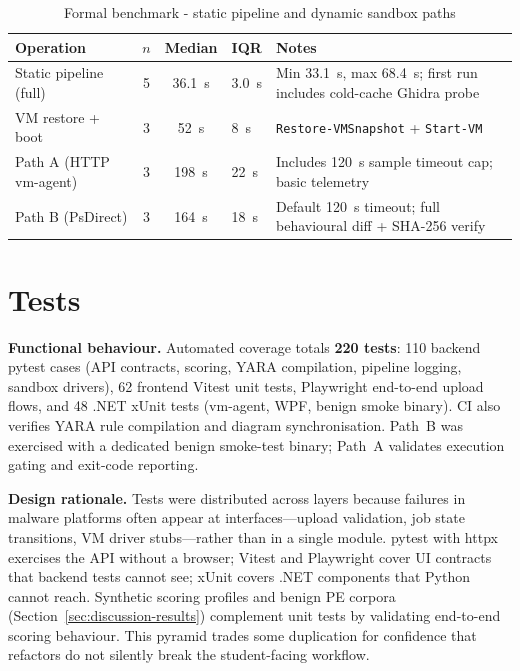 \begin{table}[htbp]
    \centering
    \caption{Formal benchmark - static pipeline and dynamic sandbox paths}
    \label{tab:benchmark}
    \small
    \begin{tabularx}{\linewidth}{@{}>{\raggedright\arraybackslash}p{3.2cm}ccp{1.0cm}Y@{}}
        \toprule
        \textbf{Operation} & \textbf{$n$} & \textbf{Median} & \textbf{IQR} & \textbf{Notes} \\
        \midrule
        Static pipeline (full) & 5 & 36.1~s & 3.0~s & Min 33.1~s, max 68.4~s; first run includes cold-cache Ghidra probe \\
        VM restore + boot & 3 & 52~s & 8~s & \texttt{Restore-VMSnapshot} + \texttt{Start-VM} \\
        Path A (HTTP vm-agent) & 3 & 198~s & 22~s & Includes 120~s sample timeout cap; basic telemetry \\
        Path B (PsDirect) & 3 & 164~s & 18~s & Default 120~s timeout; full behavioural diff + SHA-256 verify \\
        \bottomrule
    \end{tabularx}
\end{table}

\section{Tests}
\label{sec:testes}

\textbf{Functional behaviour.}
Automated coverage totals \textbf{220 tests}: 110 backend pytest cases (API contracts, scoring,
YARA compilation, pipeline logging, sandbox drivers), 62 frontend Vitest unit tests, Playwright
end-to-end upload flows, and 48 .NET xUnit tests (vm-agent, WPF, benign smoke binary). CI also
verifies YARA rule compilation and diagram synchronisation. Path~B was exercised with a dedicated
benign smoke-test binary; Path~A validates execution gating and exit-code reporting.

\textbf{Design rationale.}
Tests were distributed across layers because failures in malware platforms often appear at
interfaces---upload validation, job state transitions, VM driver stubs---rather than in a single
module. pytest with httpx exercises the API without a browser; Vitest and Playwright cover UI
contracts that backend tests cannot see; xUnit covers .NET components that Python cannot reach.
Synthetic scoring profiles and benign PE corpora (Section~\ref{sec:discussion-results}) complement
unit tests by validating end-to-end scoring behaviour. This pyramid trades some duplication for
confidence that refactors do not silently break the student-facing workflow.

